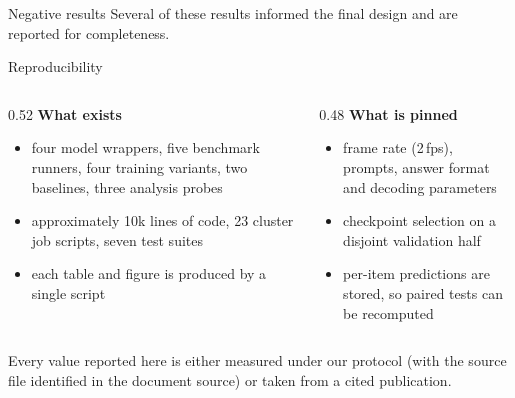 \documentclass[aspectratio=169,11pt]{beamer}
\begin{document}
\begin{frame}{Negative results}
\centering
\renewcommand{\arraystretch}{1.3}
\scriptsize
{}
\vfill
{\footnotesize Several of these results informed the final design and are reported for completeness.}
\end{frame}

\begin{frame}{Reproducibility}
\begin{columns}[T]
\begin{column}{0.52\textwidth}
\textbf{What exists}
\begin{itemize}\footnotesize
\item four model wrappers, five benchmark runners, four training variants, two baselines, three
analysis probes
\item approximately 10k lines of code, 23 cluster job scripts, seven test suites
\item each table and figure is produced by a single script
\end{itemize}
\end{column}
\begin{column}{0.48\textwidth}
\textbf{What is pinned}
\begin{itemize}\footnotesize
\item frame rate (2\,fps), prompts, answer format and decoding parameters
\item checkpoint selection on a disjoint validation half
\item per-item predictions are stored, so paired tests can be recomputed
\end{itemize}
\end{column}
\end{columns}
\vfill
\begin{center}
\begin{block}{}
\centering\footnotesize Every value reported here is either measured under our protocol (with the source
file identified in the document source) or taken from a cited publication.
\end{block}
\end{center}
\end{frame}
\end{document}
